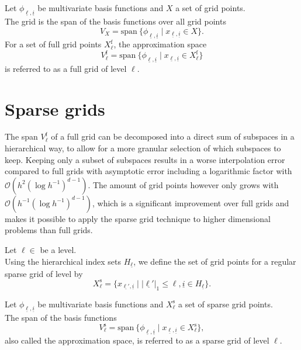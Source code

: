 \documentclass[
  a4paper,  %
  twoside,  %
  bibliography=totoc,
  headsepline,
  cleardoublepage=empty,
  parskip=half,
  draft=false
]{scrbook}
\begin{document}
\begin{definition}
Let $\phi_{\underline{\ell},\underline{i}}$ be multivariate basis functions and $X$ a set of grid points.\\
The grid is the span of the basis functions over all grid points
\begin{equation}
V_{X}=\text{span}~ \{\phi_{\underline{\ell},\underline{i}} \mid x_{\underline{\ell},\underline{i}} \in X\}.
\end{equation}
For a set of full grid points $X^{\text{f}}_{\ell}$, the approximation space
\begin{equation}
V^{\text{f}}_{\ell}=\text{span}~ \{\phi_{\underline{\ell},\underline{i}} \mid x_{\underline{\ell},\underline{i}} \in X^{\text{f}}_{\ell}\}
\label{eq:full_grid}
\end{equation}
is referred to as a full grid of level $\ell$.

\end{definition}


\section{Sparse grids}

The span $V^{\text{f}}_{\ell}$ of a full grid can be decomposed into a direct sum of subspaces in a hierarchical way, to allow for a more granular selection of which subspaces to keep.
Keeping only a subset of subspaces results in a worse interpolation error compared to full grids with asymptotic error including a logarithmic factor with $\mathcal{O}(h^2 (\log h^{-1})^{d-1})$.
The amount of grid points however only grows with $\mathcal{O}(h^{-1} (\log h^{-1})^{d-1})$, which is a significant improvement over full grids and makes it possible to apply the sparse grid technique to higher dimensional problems than full grids.

\begin{definition}
Let $\ell \in $ be a level.\\
Using the hierarchical index sets $H_{\underline{\ell}}$, we define the set of grid points for a regular sparse grid of level by
\begin{equation}
X^{\text{s}}_{\ell}=\{x_{\underline{\ell'},\underline{i}} \mid |\underline{\ell'}|_1 \leq \ell, \underline{i} \in H_{\underline{\ell}}\}.
\end{equation}
\end{definition}

\begin{definition}
Let $\phi_{\underline{\ell},\underline{i}}$ be multivariate basis functions and $X^{\text{s}}_{\ell}$ a set of sparse grid points.\\
The span of the basis functions
\begin{equation}
V^{\text{s}}_{\ell}=\text{span}~ \{\phi_{\underline{\ell},\underline{i}} \mid x_{\underline{\ell},\underline{i}} \in X^{\text{s}}_{\ell}\},
\label{eq:sparse_grid}
\end{equation}
also called the approximation space, is referred to as a sparse grid of level $\ell$.
\end{definition}
\end{document}
